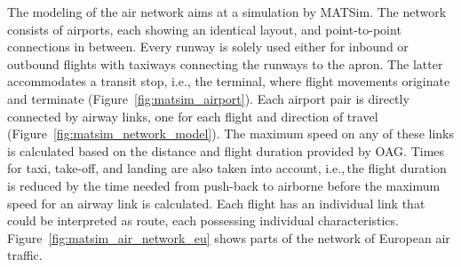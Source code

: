 The modeling of the air network aims at a simulation by MATSim. %
The network consists of airports, each showing an identical layout, and point-to-point connections in between. 
Every runway is solely used either for inbound or outbound flights with taxiways connecting the runways to the apron. The latter accommodates a transit stop, i.e., the terminal, where flight movements originate and terminate (Figure~\ref{fig:matsim_airport}). 
Each airport pair is directly connected by airway links, one for each flight and direction of travel (Figure~\ref{fig:matsim_network_model}). 
The maximum speed on any of these links is calculated based on the distance and flight duration provided by OAG. 
Times for taxi, take-off, and landing are also taken into account, i.e.,\,the flight duration is reduced by the time needed from push-back to airborne before the maximum speed for an airway link is calculated.
Each flight has an individual link that could be interpreted as route, each possessing individual characteristics. 
Figure~\ref{fig:matsim_air_network_eu} shows parts of the network of European air traffic.

